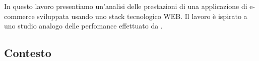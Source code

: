 In questo lavoro presentiamo un'analisi delle prestazioni di una applicazione di e-commerce sviluppata usando uno stack tecnologico WEB. Il lavoro è ispirato a uno studio analogo delle perfomance effettuato da \citet{DBLP:books/sp/Serazzi24}. 

\subsection{Contesto}

